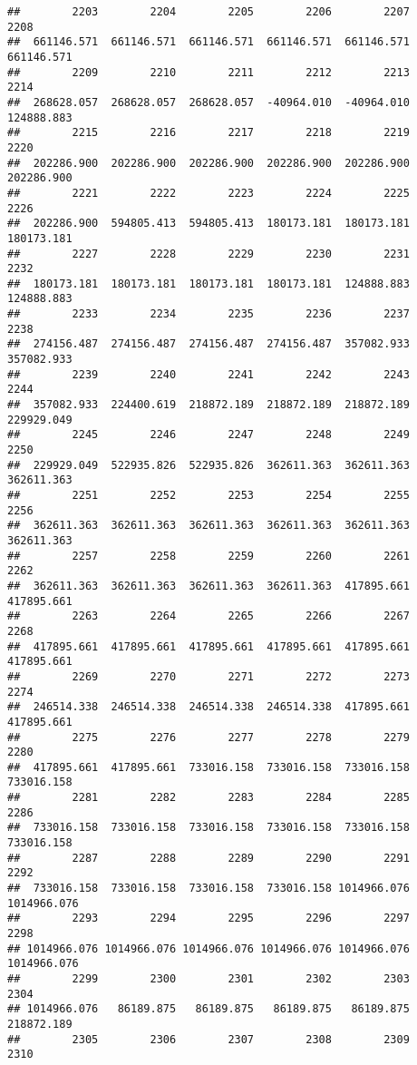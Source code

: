 \documentclass[
]{book}
\begin{document}
\begin{verbatim}
##        2203        2204        2205        2206        2207        2208 
##  661146.571  661146.571  661146.571  661146.571  661146.571  661146.571 
##        2209        2210        2211        2212        2213        2214 
##  268628.057  268628.057  268628.057  -40964.010  -40964.010  124888.883 
##        2215        2216        2217        2218        2219        2220 
##  202286.900  202286.900  202286.900  202286.900  202286.900  202286.900 
##        2221        2222        2223        2224        2225        2226 
##  202286.900  594805.413  594805.413  180173.181  180173.181  180173.181 
##        2227        2228        2229        2230        2231        2232 
##  180173.181  180173.181  180173.181  180173.181  124888.883  124888.883 
##        2233        2234        2235        2236        2237        2238 
##  274156.487  274156.487  274156.487  274156.487  357082.933  357082.933 
##        2239        2240        2241        2242        2243        2244 
##  357082.933  224400.619  218872.189  218872.189  218872.189  229929.049 
##        2245        2246        2247        2248        2249        2250 
##  229929.049  522935.826  522935.826  362611.363  362611.363  362611.363 
##        2251        2252        2253        2254        2255        2256 
##  362611.363  362611.363  362611.363  362611.363  362611.363  362611.363 
##        2257        2258        2259        2260        2261        2262 
##  362611.363  362611.363  362611.363  362611.363  417895.661  417895.661 
##        2263        2264        2265        2266        2267        2268 
##  417895.661  417895.661  417895.661  417895.661  417895.661  417895.661 
##        2269        2270        2271        2272        2273        2274 
##  246514.338  246514.338  246514.338  246514.338  417895.661  417895.661 
##        2275        2276        2277        2278        2279        2280 
##  417895.661  417895.661  733016.158  733016.158  733016.158  733016.158 
##        2281        2282        2283        2284        2285        2286 
##  733016.158  733016.158  733016.158  733016.158  733016.158  733016.158 
##        2287        2288        2289        2290        2291        2292 
##  733016.158  733016.158  733016.158  733016.158 1014966.076 1014966.076 
##        2293        2294        2295        2296        2297        2298 
## 1014966.076 1014966.076 1014966.076 1014966.076 1014966.076 1014966.076 
##        2299        2300        2301        2302        2303        2304 
## 1014966.076   86189.875   86189.875   86189.875   86189.875  218872.189 
##        2305        2306        2307        2308        2309        2310 

\end{verbatim}
\end{document}
